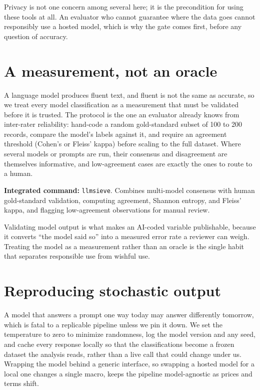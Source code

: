\documentclass[
    a4paper,
    fontsize=10pt,
    twoside=true,
    numbers=noenddot,
]{kaobook}
\begin{document}
Privacy is not one concern among several here; it is the precondition for using these tools at all. An evaluator who cannot guarantee where the data goes cannot responsibly use a hosted model, which is why the gate comes first, before any question of accuracy.

\section{A measurement, not an oracle}\label{sec:aiverify}
A language model produces fluent text, and fluent is not the same as accurate, so we treat every model classification as a measurement that must be validated before it is trusted. The protocol is the one an evaluator already knows from inter-rater reliability: hand-code a random gold-standard subset of 100 to 200 records, compare the model's labels against it, and require an agreement threshold (Cohen's or Fleiss' kappa) before scaling to the full dataset. Where several models or prompts are run, their consensus and disagreement are themselves informative, and low-agreement cases are exactly the ones to route to a human.

\begin{kaobox}[frametitle=Package Integration: \texttt{llmsieve}]
\textbf{Integrated command:} \texttt{llmsieve}. Combines multi-model consensus with human gold-standard validation, computing agreement, Shannon entropy, and Fleiss' kappa, and flagging low-agreement observations for manual review.
\end{kaobox}

Validating model output is what makes an AI-coded variable publishable, because it converts \enquote{the model said so} into a measured error rate a reviewer can weigh. Treating the model as a measurement rather than an oracle is the single habit that separates responsible use from wishful use.

\section{Reproducing stochastic output}
A model that answers a prompt one way today may answer differently tomorrow, which is fatal to a replicable pipeline unless we pin it down. We set the temperature to zero to minimize randomness, log the model version and any seed, and cache every response locally so that the classifications become a frozen dataset the analysis reads, rather than a live call that could change under us. Wrapping the model behind a generic interface, so swapping a hosted model for a local one changes a single macro, keeps the pipeline model-agnostic as prices and terms shift.
\end{document}
